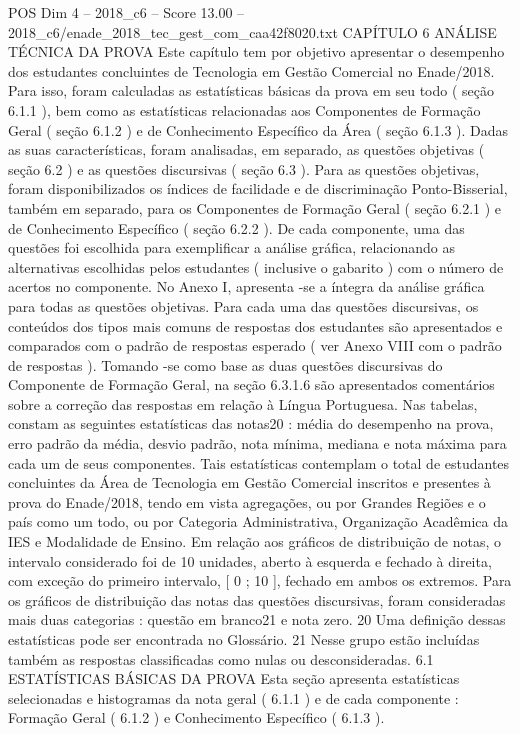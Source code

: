 \begin{textsample}{POS Dim 4 – 2018\_c6 – Score 13.00 – 2018\_c6/enade\_2018\_tec\_gest\_com\_caa42f8020.txt}  \label{ex:f4_pos_008}
CAPÍTULO 6 ANÁLISE TÉCNICA DA PROVA Este capítulo tem por objetivo apresentar o desempenho dos estudantes concluintes de Tecnologia em Gestão Comercial no Enade/2018.
Para isso, foram calculadas as estatísticas básicas da prova em seu todo ( seção 6.1.1 ), bem como as estatísticas relacionadas aos Componentes de Formação Geral ( seção 6.1.2 ) e de Conhecimento Específico da Área ( seção 6.1.3 ).
Dadas as suas características, foram analisadas, em separado, as questões objetivas ( seção 6.2 ) e as questões discursivas ( seção 6.3 ).
Para as questões objetivas, foram disponibilizados os índices de facilidade e de discriminação Ponto-Bisserial, também em separado, para os Componentes de Formação Geral ( seção 6.2.1 ) e de Conhecimento Específico ( seção 6.2.2 ).
De cada componente, uma das questões foi escolhida para exemplificar a análise gráfica, relacionando as alternativas escolhidas pelos estudantes ( inclusive o gabarito ) com o número de acertos no componente.
No Anexo I, apresenta -se a íntegra da análise gráfica para todas as questões objetivas.
Para cada uma das questões discursivas, os conteúdos dos tipos mais comuns de respostas dos estudantes são apresentados e comparados com o padrão de respostas esperado ( ver Anexo VIII com o padrão de respostas ).
Tomando -se como base as duas questões discursivas do Componente de Formação Geral, na seção 6.3.1.6 são apresentados comentários sobre a correção das respostas em relação à Língua Portuguesa.
Nas tabelas, constam as seguintes estatísticas das notas20 : média do desempenho na prova, erro padrão da média, desvio padrão, nota mínima, mediana e nota máxima para cada um de seus componentes.
Tais estatísticas contemplam o total de estudantes concluintes da Área de Tecnologia em Gestão Comercial inscritos e presentes à prova do Enade/2018, tendo em vista agregações, ou por Grandes Regiões e o país como um todo, ou por Categoria Administrativa, Organização Acadêmica da IES e Modalidade de Ensino.
Em relação aos gráficos de distribuição de notas, o intervalo considerado foi de 10 unidades, aberto à esquerda e fechado à direita, com exceção do primeiro intervalo, [ 0 ; 10 ], fechado em ambos os extremos.
Para os gráficos de distribuição das notas das questões discursivas, foram consideradas mais duas categorias : questão em branco21 e nota zero. 20 Uma definição dessas estatísticas pode ser encontrada no Glossário. 21 Nesse grupo estão incluídas também as respostas classificadas como nulas ou desconsideradas. 6.1 ESTATÍSTICAS BÁSICAS DA PROVA Esta seção apresenta estatísticas selecionadas e histogramas da nota geral ( 6.1.1 ) e de cada componente : Formação Geral ( 6.1.2 ) e Conhecimento Específico ( 6.1.3 ).

\end{textsample}
